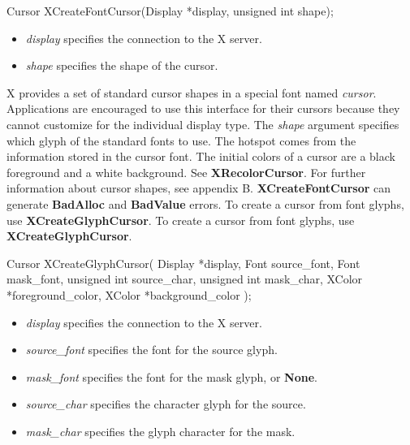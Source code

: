 \documentclass{report}
\begin{document}
\begin{itemize}
\begin{cppcode}
                Cursor XCreateFontCursor(Display *display, unsigned int shape);
            \end{cppcode}
            \begin{itemize}
                \item \textit{display} specifies the connection to the X server.
                \item \textit{shape} specifies the shape of the cursor.
            \end{itemize}
            \bigbreak \noindent
            X provides a set of standard cursor shapes in a special font named \textit{cursor}. Applications are encouraged to use this interface for their cursors because they cannot customize for the individual display type. The \textit{shape} argument specifies which glyph of the standard fonts to use.
            \bigbreak \noindent
            The hotspot comes from the information stored in the cursor font. The initial colors of a cursor are a black foreground and a white background. See \textbf{XRecolorCursor}. For further information about cursor shapes, see appendix B.
            \bigbreak \noindent
            \textbf{XCreateFontCursor} can generate \textbf{BadAlloc} and \textbf{BadValue} errors.
            \bigbreak \noindent
            To create a cursor from font glyphs, use \textbf{XCreateGlyphCursor}.
            \bigbreak \noindent
            To create a cursor from font glyphs, use \textbf{XCreateGlyphCursor}.
            \bigbreak \noindent
            \begin{cppcode}
                Cursor XCreateGlyphCursor(
                    Display *display,
                    Font source_font,
                    Font mask_font,
                    unsigned int source_char,
                    unsigned int mask_char,
                    XColor *foreground_color,
                    XColor *background_color
                );
            \end{cppcode}
            \begin{itemize}
                \item \textit{display} specifies the connection to the X server.
                \item \textit{source\_font} specifies the font for the source glyph.
                \item \textit{mask\_font} specifies the font for the mask glyph, or \textbf{None}.
                \item \textit{source\_char} specifies the character glyph for the source.
                \item \textit{mask\_char} specifies the glyph character for the mask.

\end{itemize}
\end{itemize}
\end{document}
